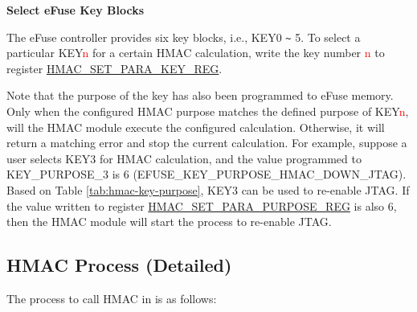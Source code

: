 \documentclass[main\_\_EN.tex]{subfiles}
\begin{document}
\textbf{Select eFuse Key Blocks}
\label{sec:hmac-config-efuse-key}

The eFuse controller provides six key blocks, i.e., KEY0 \verb+~+ 5. To select a particular KEY\textcolor{red}{n} for a certain HMAC calculation, write the key number \textcolor{red}{n} to register \hyperref[regdesc:HMACSETPARAKEYREG]{HMAC\_SET\_PARA\_KEY\_REG}.

Note that the purpose of the key has also been programmed to eFuse memory. Only when the configured HMAC purpose matches the defined purpose of KEY\textcolor{red}{n}, will the HMAC module execute the configured calculation. Otherwise, it will return a matching error and stop the current calculation.
For example, suppose a user selects KEY3 for HMAC calculation, and the value programmed to KEY\_PURPOSE\_3 is 6 (EFUSE\_KEY\_PURPOSE\_HMAC\_DOWN\_JTAG). Based on Table \ref{tab:hmac-key-purpose}, KEY3 can be used to re-enable JTAG. If the value written to register \hyperref[regdesc:HMACSETPARAPURPOSEREG]{HMAC\_SET\_PARA\_PURPOSE\_REG} is also 6, then the HMAC module will start the process to re-enable JTAG.


\subsection{HMAC Process (Detailed)}
\label{sec:hmac-process-detailed}

The process to call HMAC in \chipname{} is as follows:
\end{document}
